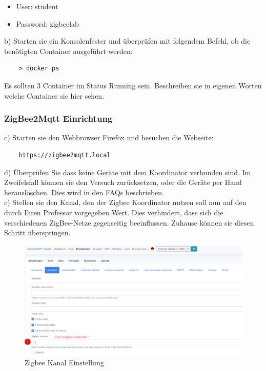 \begin{itemize}
    \item User: student 
    \item Password: zigbeelab
\end{itemize}

b) Starten sie ein Konsolenfester und überprüfen mit folgendem Befehl, ob die benötigten Container ausgeführt werden:
\begin{lstlisting}
    > docker ps
\end{lstlisting}

Es sollten 3 Container im Status \grqq Running\grqq{} sein. Beschreiben sie in eigenen Worten welche Container sie hier sehen.

\subsubsection{ZigBee2Mqtt Einrichtung}

c) Starten sie den Webbrowser Firefox und besuchen die Webseite:
\begin{lstlisting}
    https://zigbee2mqtt.local
\end{lstlisting}

d) Überprüfen Sie  dass keine Geräte mit dem Koordinator verbunden sind. Im Zweifelsfall können sie den Versuch zurücksetzen, oder die Geräte per Hand
herauslöschen.
Dies wird in den FAQs beschrieben.\\

c) Stellen sie den Kanal, den der Zigbee Koordinator nutzen soll nun auf den durch Ihren Professor vorgegeben Wert.
Dies verhindert, dass sich die verschiedenen ZigBee-Netze gegenseitig beeinflussen. Zuhause können sie diesen Schritt überspringen.

\begin{figure}[H]
    \centering
    \includegraphics[width=1\textwidth]{media/Z2M-Channel.png}
    \caption{Zigbee Kanal Einstellung}
\end{figure}

